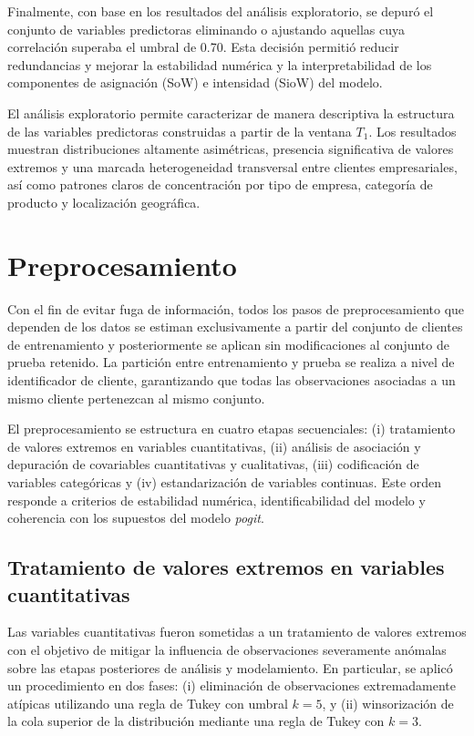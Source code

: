     Finalmente, con base en los resultados del análisis exploratorio, se depuró el conjunto de variables predictoras eliminando o ajustando aquellas cuya correlación superaba el umbral de 0.70. Esta decisión permitió reducir redundancias y mejorar la estabilidad numérica y la interpretabilidad de los componentes de asignación (SoW) e intensidad (SioW) del modelo.

    El análisis exploratorio permite caracterizar de manera descriptiva la estructura de las variables predictoras construidas a partir de la ventana \(T_1\). Los resultados muestran distribuciones altamente asimétricas, presencia significativa de valores extremos y una marcada heterogeneidad transversal entre clientes empresariales, así como patrones claros de concentración por tipo de empresa, categoría de producto y localización geográfica.
\section{Preprocesamiento}

    Con el fin de evitar fuga de información, todos los pasos de preprocesamiento que dependen de los datos se estiman exclusivamente a partir del conjunto de clientes de entrenamiento y posteriormente se aplican sin modificaciones al conjunto de prueba retenido. La partición entre entrenamiento y prueba se realiza a nivel de identificador de cliente, garantizando que todas las observaciones asociadas a un mismo cliente pertenezcan al mismo conjunto.
    
    El preprocesamiento se estructura en cuatro etapas secuenciales: (i) tratamiento de valores extremos en variables cuantitativas, (ii) análisis de asociación y depuración de covariables cuantitativas y cualitativas, (iii) codificación de variables categóricas y (iv) estandarización de variables continuas. Este orden responde a criterios de estabilidad numérica, identificabilidad del modelo y coherencia con los supuestos del modelo \emph{pogit}.

\subsection{Tratamiento de valores extremos en variables cuantitativas}

    Las variables cuantitativas fueron sometidas a un tratamiento de valores extremos con el objetivo de mitigar la influencia de observaciones severamente anómalas sobre las etapas posteriores de análisis y modelamiento. En particular, se aplicó un procedimiento en dos fases: (i) eliminación de observaciones extremadamente atípicas utilizando una regla de Tukey con umbral $k = 5$, y (ii) winsorización de la cola superior de la distribución mediante una regla de Tukey con $k = 3$.
    
